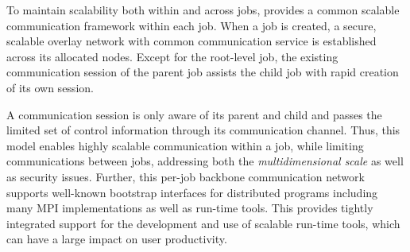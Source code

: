 
To maintain scalability both within and across jobs, \flux 
provides a common scalable communication 
framework within each job. When a job is created, a secure, scalable 
overlay network with common communication service is established 
across its allocated nodes. Except for the root-level job, 
the existing communication session of the parent job assists 
the child job with rapid creation of its own session. 

A communication session is only aware of its parent 
and child and passes the limited set of control information 
through its communication channel. Thus, this model 
enables highly scalable communication within a job, while 
limiting communications between jobs, addressing 
both the {\em multidimensional scale} as well as security issues.
Further, this per-job backbone communication network 
supports well-known bootstrap interfaces 
for distributed programs including many MPI implementations 
as well as run-time tools. This provides tightly integrated support
for the development and use of scalable run-time tools, which 
can have a large impact on user productivity.
